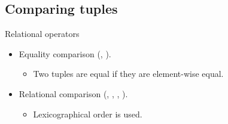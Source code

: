 \subsection{Comparing tuples}

\begin{frame}[t]{Relational operators}
  \begin{itemize}
    \item Equality comparison (\cppid{==}, \cppid{!=}).
      \begin{itemize}
        \item Two tuples are equal if they are element-wise equal.
      \end{itemize}
    \item Relational comparison (\cppid{<}, \cppid{>}, \cppid{<=}, \cppid{>=}).
      \begin{itemize}
        \item Lexicographical order is used.
      \end{itemize}
  \end{itemize}
\end{frame}
